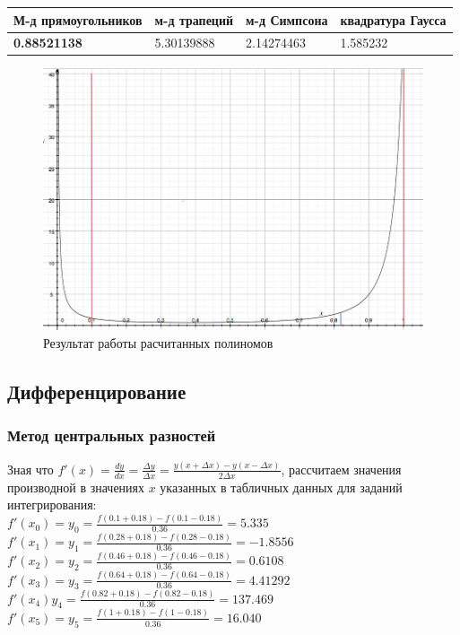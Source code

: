 \documentclass{article}
\begin{document}
\begin{center}
  \begin{tabular}{|l|l|l|l|}
  \hline
  \bfseries М-д прямоугольников & м-д трапеций & м-д Симпсона & квадратура Гаусса\\
  \hline
  \bfseries 0.88521138 & 5.30139888 & 2.14274463 & 1.585232 \\
  \hline
  \end{tabular}
\end{center}

 \begin{figure}[h!]
    \includegraphics[width=13cm]{result-int.png}
    \caption{Результат работы расчитанных полиномов}
  \end{figure}

\subsection{Дифференцирование}
\subsubsection{Метод центральных разностей}
Зная что $ f'(x) = 
 \frac{dy}{dx} =
 \frac{\Delta y}{\Delta x} =
 \frac{y(x + \Delta x) - y(x - \Delta x)}{2 \Delta x}$, рассчитаем значения
 производной в значениях $x$ указанных в табличных данных для заданий
 интегрирования: \\ 
$f'(x_{0}) = y_{0} = \frac{f(0.1 + 0.18) - f(0.1 - 0.18)}{0.36 } = 5.335$\\
$f'(x_{1})=y_{1} = \frac{f(0.28 + 0.18) - f(0.28 - 0.18)}{0.36 } =
-1.8556$\\
$f'(x_{2})=y_{2} = \frac{f(0.46 + 0.18) - f(0.46 - 0.18)}{0.36 } =
0.6108$\\
$f'(x_{3})=y_{3} = \frac{f(0.64 + 0.18) - f(0.64 - 0.18)}{0.36 } =
4.41292 $\\
$f'(x_{4})y_{4} = \frac{f(0.82 + 0.18) - f(0.82 - 0.18)}{0.36 } =
137.469 $\\
$f'(x_{5})=y_{5} = \frac{f(1 + 0.18) - f(1 - 0.18)}{0.36 } = 16.040$
\end{document}
